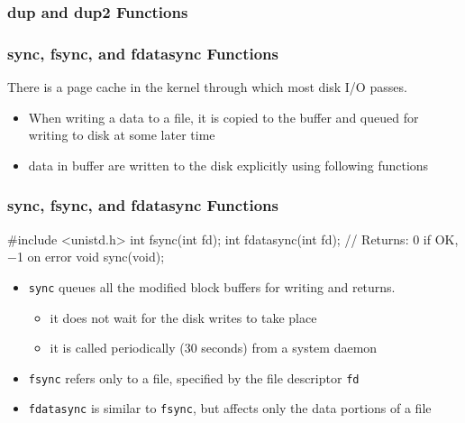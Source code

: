 \documentclass[newPxFont,sthlmFooter,nooffset]{beamer}
\begin{document}
\begin{frame}
  \frametitle{dup and dup2 Functions}
\end{frame}


\begin{frame}[containsverbatim,t]
  \frametitle{sync, fsync, and fdatasync Functions}
There is a page cache in the kernel through which most disk I/O passes.
\begin{itemize}
\item When writing a data to a file, it is copied to the buffer and queued for writing to disk at some later time
\item data in buffer are written to the disk explicitly using following functions
\end{itemize}
\end{frame}

\begin{frame}[containsverbatim,t]
  \frametitle{sync, fsync, and fdatasync Functions}
\begin{codedef}
#include <unistd.h> 
int fsync(int fd); 
int fdatasync(int fd);
// Returns: 0 if OK, −1 on error
void sync(void);    
\end{codedef}

\begin{itemize}
\item \texttt{sync} queues all the modified block buffers for writing and returns.
  \begin{itemize}
  \item it does not wait for the disk writes to take place
  \item it is called periodically (30 seconds) from a system daemon
  \end{itemize}
\item \texttt{fsync} refers only to a file, specified by the file descriptor \texttt{fd}
\item \texttt{fdatasync} is similar to \texttt{fsync}, but affects only the data portions of a file
\end{itemize}

\end{frame}
\end{document}
